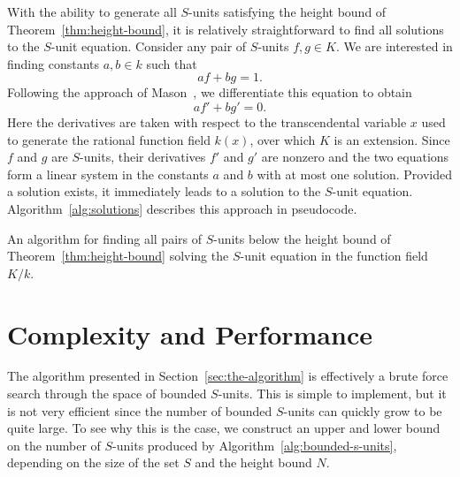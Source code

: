 With the ability to generate all \(S\)-units satisfying the height bound of Theorem~\ref{thm:height-bound}, it is relatively straightforward to find all solutions to the \(S\)-unit equation. Consider any pair of \(S\)-units \(f, g \in K\). We are interested in finding constants \(a, b \in k\) such that
\[af + bg = 1.\]
Following the approach of Mason~\cite{mason-1984-diophantine-equations-over}, we differentiate this equation to obtain
\[af' + bg' = 0.\]
Here the derivatives are taken with respect to the transcendental variable \(x\) used to generate the rational function field \(k(x)\), over which \(K\) is an extension. Since \(f\) and \(g\) are \(S\)-units, their derivatives \(f'\) and \(g'\) are nonzero and the two equations form a linear system in the constants \(a\) and \(b\) with at most one solution. Provided a solution exists, it immediately leads to a solution to the \(S\)-unit equation. Algorithm~\ref{alg:solutions} describes this approach in pseudocode.

\begin{algorithm}[htb]
  \caption{An algorithm for finding all pairs of \(S\)-units below the height bound of Theorem~\ref{thm:height-bound} solving the \(S\)-unit equation in the function field \(K / k\).}%
  \label{alg:solutions}
  \begin{algorithmic}[]
     
     
     
     
    \EndIf{}
    \EndIf{}
    \EndFor{}
    \EndFor{}
    \EndFunction{}
  \end{algorithmic}
\end{algorithm}

\section{Complexity and Performance}%
\label{sec:complexity-and-performance}

The algorithm presented in Section~\ref{sec:the-algorithm} is effectively a brute force search through the space of bounded \(S\)-units. This is simple to implement, but it is not very efficient since the number of bounded \(S\)-units can quickly grow to be quite large. To see why this is the case, we construct an upper and lower bound on the number of \(S\)-units produced by Algorithm~\ref{alg:bounded-s-units}, depending on the size of the set \(S\) and the height bound \(N\).

